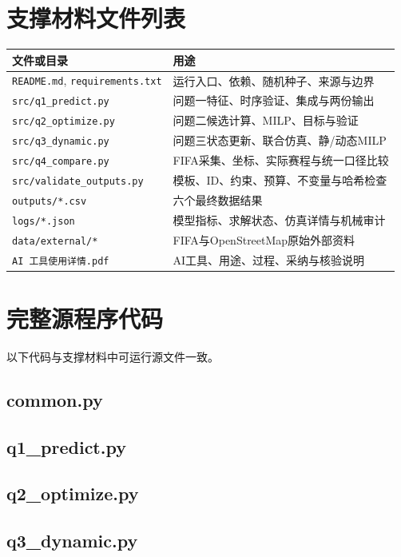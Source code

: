 \documentclass[UTF8,11pt,a4paper]{ctexart}
\begin{document}
\section{支撑材料文件列表}
\begin{longtable}{p{5.0cm}p{9.5cm}}
\toprule 文件或目录 & 用途\\\midrule
\texttt{README.md}, \texttt{requirements.txt} & 运行入口、依赖、随机种子、来源与边界\\
\texttt{src/q1\_predict.py} & 问题一特征、时序验证、集成与两份输出\\
\texttt{src/q2\_optimize.py} & 问题二候选计算、MILP、目标与验证\\
\texttt{src/q3\_dynamic.py} & 问题三状态更新、联合仿真、静/动态MILP\\
\texttt{src/q4\_compare.py} & FIFA采集、坐标、实际赛程与统一口径比较\\
\texttt{src/validate\_outputs.py} & 模板、ID、约束、预算、不变量与哈希检查\\
\texttt{outputs/*.csv} & 六个最终数据结果\\
\texttt{logs/*.json} & 模型指标、求解状态、仿真详情与机械审计\\
\texttt{data/external/*} & FIFA与OpenStreetMap原始外部资料\\
\texttt{AI 工具使用详情.pdf} & AI工具、用途、过程、采纳与核验说明\\
\bottomrule
\end{longtable}

\section{完整源程序代码}
以下代码与支撑材料中可运行源文件一致。
\subsection{common.py}
\subsection{q1\_predict.py}
\subsection{q2\_optimize.py}
\subsection{q3\_dynamic.py}
\end{document}
